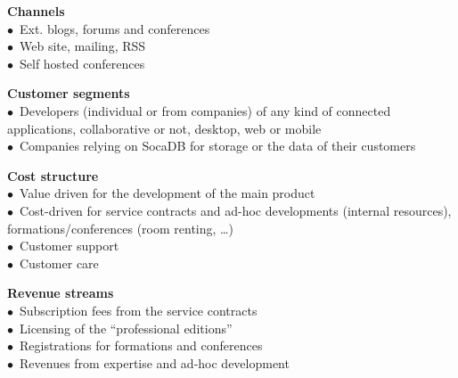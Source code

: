\documentclass[a4paper,10pt]{scrreprt}
\begin{document}
\begin{sideways}
\begin{small}
\begin{minipage}{\textheight}
\begin{minipage}[t]{0.19\textheight}
        \vspace{3.5em} \hrulefill \medskip

        \begin{minipage}[t]{\textwidth}
        \begin{flushleft}
            \textbf{\color{MSBlue}\large Channels}\\
            $\bullet$~Ext. blogs, forums and conferences\\
            $\bullet$~Web site, mailing, RSS\\
            $\bullet$~Self hosted conferences
        \end{flushleft}
        \end{minipage}
    \end{minipage}
    \hfill
    \begin{minipage}[t]{0.19\textheight}
    \begin{flushleft}
        \textbf{\color{MSBlue}\large Customer segments}\\
        $\bullet$~Developers (individual or from companies) of any kind of connected applications, collaborative or not, desktop, web or mobile\\
        $\bullet$~Companies relying on SocaDB for storage or the data of their customers
    \end{flushleft}
    \end{minipage}

    \vspace{1em} \hrulefill \medskip

    \begin{minipage}[t]{0.49\textheight}
    \begin{flushleft}
        \textbf{\color{MSBlue}\large Cost structure}\\
        $\bullet$~Value driven for the development of the main product\\
        $\bullet$~Cost-driven for service contracts and ad-hoc developments (internal resources), formations/conferences (room renting, …)\\
        $\bullet$~Customer support\\
        $\bullet$~Customer care
    \end{flushleft}
    \end{minipage}
    \hfill
    \begin{minipage}[t]{0.49\textheight}
    \begin{flushleft}
        \textbf{\color{MSBlue}\large Revenue streams}\\
        $\bullet$~Subscription fees from the service contracts\\
        $\bullet$~Licensing of the “professional editions”\\
        $\bullet$~Registrations for formations and conferences\\
        $\bullet$~Revenues from expertise and ad-hoc development
    \end{flushleft}
    \end{minipage}


\end{minipage}
\end{small}
\end{sideways}
\end{document}

